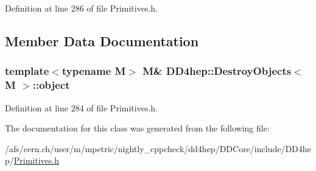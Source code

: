 Definition at line 286 of file Primitives.h.

\subsection{Member Data Documentation}
\hypertarget{class_d_d4hep_1_1_destroy_objects_a6561f28791b7de118aefc686be64c55d}{
\subsubsection[{object}]{\setlength{\rightskip}{0pt plus 5cm}template$<$typename M$>$ M\& {\bf DD4hep::DestroyObjects}$<$ M $>$::{\bf object}}}
\label{class_d_d4hep_1_1_destroy_objects_a6561f28791b7de118aefc686be64c55d}


Definition at line 284 of file Primitives.h.

The documentation for this class was generated from the following file:\begin{DoxyCompactItemize}
\item 
/afs/cern.ch/user/m/mpetric/nightly\_\-cppcheck/dd4hep/DDCore/include/DD4hep/\hyperlink{_primitives_8h}{Primitives.h}\end{DoxyCompactItemize}
